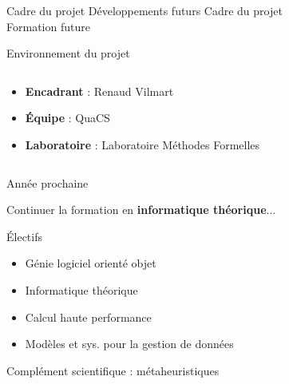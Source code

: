 \begin{frame}{Cadre du projet Développements futurs}
  \huge{Cadre du projet \\ Formation future}
\end{frame}

\begin{frame}{Environnement du projet}
  \begin{columns}
      \begin{column}{0.6\textwidth}
          \begin{itemize}
              \item \textbf{Encadrant} : Renaud Vilmart
              \item \textbf{Équipe} : QuaCS
              \item \textbf{Laboratoire} : Laboratoire Méthodes Formelles
          \end{itemize}
      \end{column}
      \begin{column}{0.4\textwidth}
          \begin{center}
              
              \vspace{0.5cm}
              
          \end{center}
      \end{column}
  \end{columns}
\end{frame}

\begin{frame}{Année prochaine}
  \begin{center}
    Continuer la formation en \textbf{informatique théorique}...
  \end{center}
  \small{Électifs} %
  \footnotesize{
  \begin{itemize}
    \item Génie logiciel orienté objet
    \item Informatique théorique
    \item Calcul haute performance
    \item Modèles et sys. pour la gestion de données
  \end{itemize}}
  \vspace{1em}
  \small{Complément scientifique : métaheuristiques}
\end{frame}

